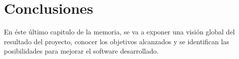 

\chapter{Conclusiones}
\thispagestyle{chapterpage}

En éste último capitulo de la memoria, se va a exponer una visión global del resultado del proyecto, 
conocer los objetivos alcanzados y se identifican las posibilidades para mejorar el software desarrollado.





